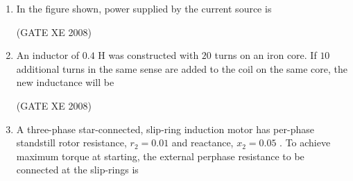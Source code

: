 \documentclass[12pt]{article}
\begin{document}
\begin{enumerate}
\begin{multicols}{2}
\end{multicols}


(GATE XE 2008)


\item In the figure shown, power supplied by the current source is

\begin{figure}[H]
\centering
{}%
\caption{}
\label{fig:my_label}
\end{figure}

\begin{enumerate}
\end{enumerate}

(GATE XE 2008)
\item An inductor of $0.4$ H was constructed with $20$ turns on an iron core. If $10$ additional turns in the same sense are added to the coil on the same core, the new inductance will be

\begin{enumerate}
\end{enumerate}

(GATE XE 2008)
\item  A three-phase star-connected, slip-ring induction motor has per-phase standstill rotor resistance, $r_{2} = 0.01$ and reactance, $x_{2} = 0.05$ . To achieve maximum torque at starting, the external perphase resistance to be connected at the slip-rings is


\end{enumerate}
\end{document}
